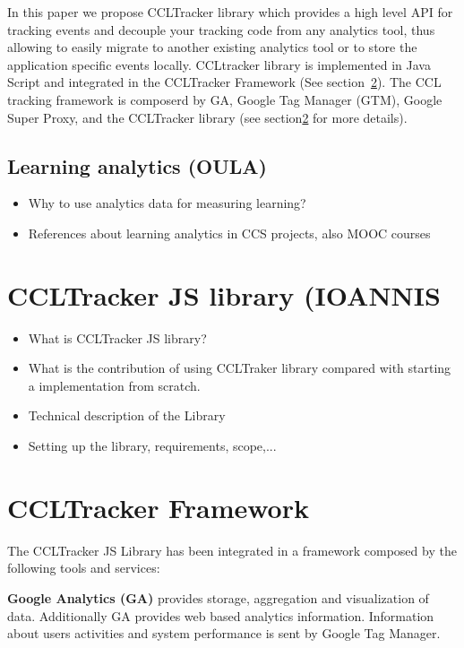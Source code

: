 \documentclass{article}
\begin{document}


In this paper we propose CCLTracker library which provides a high level API for tracking events and decouple your tracking code from any analytics tool, thus allowing to easily migrate to another existing analytics tool or to store the application specific events locally. CCLtracker library is implemented in Java Script and integrated in the CCLTracker Framework (See section~\ref{sec:CCLtrackerFramerwork}). The CCL tracking framework is composerd by GA, Google Tag Manager (GTM), Google Super Proxy, and the CCLTracker library (see section\ref{sec:CCLtrackerFramerwork} for more details). 


\subsection{Learning analytics (OULA)}
\begin{itemize}
\item Why to use analytics data for measuring learning?
\item References about learning analytics in CCS projects, also MOOC courses
\end{itemize}

 
\section{CCLTracker JS library (IOANNIS}

\begin{itemize}
\item What is CCLTracker JS library?
\item What is the contribution of using CCLTraker library compared with starting a implementation from scratch. 
\item Technical description of the Library
\item Setting up the library, requirements, scope,...

\end{itemize}


\section{CCLTracker Framework}\label{sec:CCLtrackerFramerwork}

The CCLTracker JS Library has been integrated in a framework composed by the following tools and services:

\textbf{Google Analytics (GA)} provides storage, aggregation and visualization of data. Additionally GA provides web based analytics information. Information about users activities and system performance is sent by Google Tag Manager. 
\end{document}
